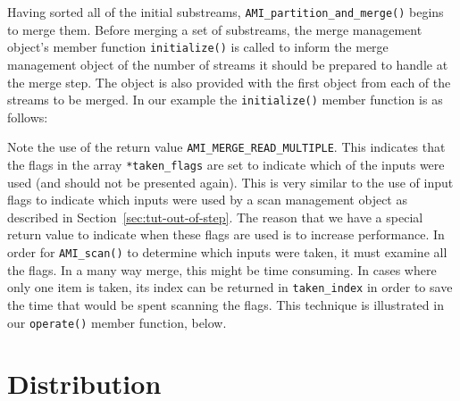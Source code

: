 

Having sorted all of the initial substreams,
\lstinline|AMI_partition_and_merge()| begins to merge them.  Before
merging a set of substreams, the merge management object's member
function \lstinline|initialize()| is called to inform the merge
management object of the number of streams it should be prepared to
handle at the merge step.  The object is also provided with the first
object from each of the streams to be merged.  In our example the
\lstinline|initialize()| member function is as follows:



Note the use of the return value \lstinline|AMI_MERGE_READ_MULTIPLE|.
This indicates that the flags in the array \lstinline|*taken_flags|
are set to indicate which of the inputs were used (and should not be
presented again).  This is very similar to the use of input flags to
indicate which inputs were used by a scan management object as
described in Section~\ref{sec:tut-out-of-step}.  The reason that we
have a special return value to indicate when these flags are used is
to increase performance.  In order for \lstinline|AMI_scan()| to
determine which inputs were taken, it must examine all the flags.  In
a many way merge, this might be time consuming.  In cases where only
one item is taken, its index can be returned in
\lstinline|taken_index| in order to save the time that would be spent
scanning the flags.  This technique is illustrated in our
\lstinline|operate()| member function, below.





\section{Distribution} 

\tobewritten


%


